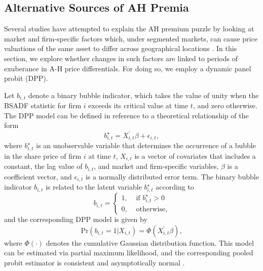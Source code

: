 \documentclass[11pt]{article}
\begin{document}
\subsection{Alternative Sources of AH Premia}

Several studies have attempted to explain the AH premium puzzle by looking at market and firm-specific factors which, under segmented markets, can cause price valuations of the same asset to differ across geographical locations \citep{wangJ2004, caiMZ2011,seasholesL2011,chungHL2013}. In this section, we explore whether changes in such factors are linked to periods of exuberance in A-H price differentials. For doing so, we employ a dynamic panel probit (DPP). 

Let $b_{i,t}$ denote a binary bubble indicator, which takes the value of unity when the BSADF statistic for firm $i$ exceeds its critical value at time $t$, and zero otherwise. The DPP model can be defined in reference to a theoretical relationship of the form
\begin{equation}\label{eq:prob1}
    b_{i,t}^{\star} = X_{i,t}^{\prime} \beta + \epsilon_{i,t},
\end{equation}
where $b_{i,t}^{\star}$ is an unobservable variable that determines the occurrence of a bubble in the share price of firm $i$ at time $t$, $X_{i,t}$ is a vector of covariates that includes a constant, the lag value of $b_{i,t}$, and market and firm-specific variables, $\beta$ is a coefficient vector, and $\epsilon_{i,t}$ is a normally distributed error term. The binary bubble indicator $b_{i,t}$ is related to the latent variable $b_{i,t}^{\star}$ according to 
\begin{equation}  \label{eq:prob2}
b_{i,t}=\left\{
\begin{array}{cl}
1, & \text{ if $b_{i,t}^{\star}>0$}  \\
0, & \text{ otherwise},
\end{array}
\right.
\end{equation}
and the corresponding DPP model is given by
\begin{equation}\label{eq:prob3}
\text{Pr}(b_{i,t}=1|X_{i,t})=\Phi(X_{i,t}^{\prime} \beta),
\end{equation}
where $\Phi(\cdot)$ denotes the cumulative Gaussian distribution function. This model can be estimated via partial maximum likelihood, and the corresponding pooled probit estimator is consistent and asymptotically normal \citep[][Ch. 13]{wooldridge2001}. 
\end{document}
